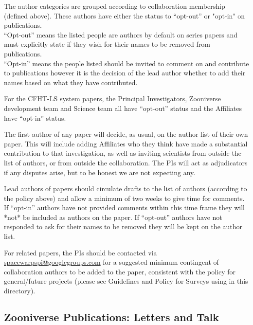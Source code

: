 \documentclass[a4paper]{article}
\begin{document}
\noindent The author categories are grouped according to collaboration membership (defined above). These authors have either the status to ``opt-out'' or "opt-in" on \sw publications.  \\
``Opt-out'' means the listed people are authors by default on \sw series papers and must explicitly state if they wish for their names to be removed from \sw publications. \\
``Opt-in'' means the people listed should be invited to comment on and contribute to publications however it is the decision of the lead author whether to add their names based on what they have contributed.

For the CFHT-LS \sw system papers, the Principal Investigators, Zooniverse development team and \sw Science team all have ``opt-out'' status and the \sw Affiliates have ``opt-in'' status.

The first author of any \sw paper will decide, as usual, on the author list of their own paper. This will include adding Affiliates who they think have made a substantial contribution to that investigation, as well as inviting scientists from outside the list of \sw authors, or from outside the
collaboration.  The \sw PIs will act as adjudicators if any disputes arise, but to be honest we are not expecting any.

Lead authors of \sw papers should circulate drafts to the list of \sw authors (according to the policy above) and allow a minimum of two weeks to give time for comments. If  ``opt-in'' authors have not provided comments within this time frame they will *not* be included as authors on the paper. If ``opt-out'' authors have not responded to ask for their names to be removed they will be kept on the author list.



For \sw related papers, the \sw PIs should be contacted via \href{mailto:spacewarpspi@googlegroups.com}{spacewarpspi@googlegroups.com} for a suggested minimum contingent of collaboration authors to be added to the paper, consistent with the policy for general/future \sw projects (please see Guidelines and Policy for Surveys using \sw in this directory). 



\subsection{Zooniverse Publications: Letters and Talk }
\label{sec:zoolet}
\end{document}
